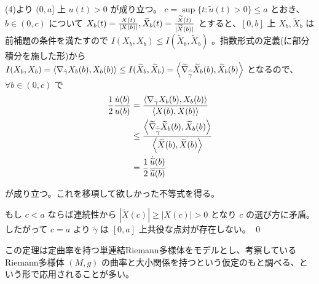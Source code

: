 \documentclass[dvipdfmx,a4paper]{jsreport}
\theoremstyle{definition}
\renewcommand{\tilde}{\widetilde}
\begin{document}
(4)より $(0,a]$ 上 $u(t)>0$ が成り立つ。 $c=\sup\{t \colon \tilde{u}(t)>0\} \leq a$ とおき、 $b \in (0,c)$ について $X_b(t)={X(t) \over |X(b)|},\tilde{X}_b(t)={\tilde{X}(t) \over |\tilde{X}(b)|}$ とすると、$[0,b]$ 上 $X_b,\tilde{X}_b$ は前補題の条件を満たすので $I(X_b,X_b) \leq I(\tilde{X}_b,\tilde{X}_b)$ 。指数形式の定義(に部分積分を施した形)から $I(X_b,X_b)=\ev{\nabla_{\dot{\gamma}}X_b(b),X_b(b)} \leq I(\tilde{X}_b,\tilde{X}_b)=\ev{\tilde{\nabla}_{\dot{\tilde{\gamma}}}\tilde{X}_b(b),\tilde{X}_b(b)}$ となるので、$\forall b \in (0,c)$ で
\begin{align*}
    {1 \over 2}{\dot{u}(b)\over u(b)} &= {\ev{\nabla_{\dot{\gamma}}X_b(b),X_b(b)} \over \ev{X(b),X(b)}} \\
    &\leq {\ev{\tilde{\nabla}_{\dot{\tilde{\gamma}}}\tilde{X}_b(b),\tilde{X}_b(b)} \over \ev{\tilde{X}(b),\tilde{X}(b)}} \\
    &= {1 \over 2}{\dot{\tilde{u}}(b)\over \tilde{u}(b)}
\end{align*}

が成り立つ。これを移項して欲しかった不等式を得る。

もし $c<a$ ならば連続性から $|\tilde{X}(c)| \geq |X(c)|>0$ となり $c$ の選び方に矛盾。したがって $c=a$ より $\tilde{\gamma}$ は $[0,a]$ 上共役な点対が存在しない。 \qed

この定理は定曲率を持つ単連結Riemann多様体をモデルとし、考察しているRiemann多様体 $(M,g)$ の曲率と大小関係を持つという仮定のもと調べる、という形で応用されることが多い。
\end{document}
